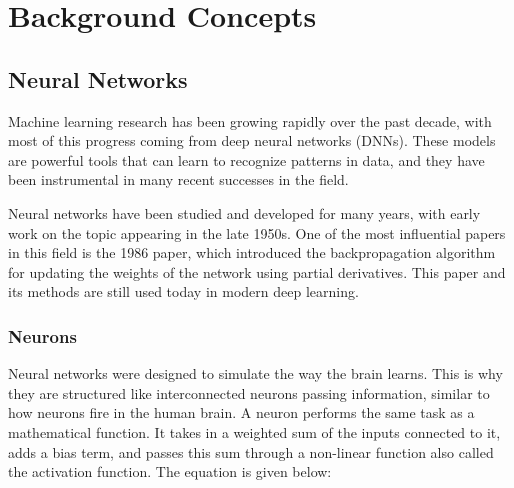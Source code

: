 
\chapter{Background Concepts} %

\label{Chapter2} %


\section{Neural Networks}

Machine learning research has been growing rapidly over the past decade, with most of this progress coming from deep neural networks (DNNs). These models are powerful tools that can learn to recognize patterns in data, and they have been instrumental in many recent successes in the field.

Neural networks have been studied and developed for many years, with early work on the topic appearing in the late 1950s\cite{Rosenblatt1958ThePA}. One of the most influential papers in this field is the 1986 paper\cite{Rumelhart1986LearningRB}, which introduced the backpropagation algorithm for updating the weights of the network using partial derivatives. This paper and its methods are still used today in modern deep learning.


\subsection{Neurons}

Neural networks were designed to simulate the way the brain learns. This is why they are structured like interconnected neurons passing information, similar to how neurons fire in the human brain. 
A neuron performs the same task as a mathematical function. It takes in a weighted sum of the inputs connected to it, adds a bias term, and passes this sum through a non-linear function also called the activation function. The equation is given below:

